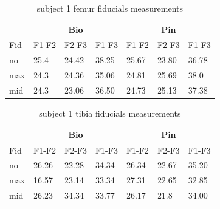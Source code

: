 \begin{table}[]
\centering
\begin{tabular}{ll|lll|lll|}
\cline{3-8}
    &  & \multicolumn{3}{c|}{Bio}  & \multicolumn{3}{c|}{Pin}    \\ \hline
\multicolumn{2}{|l|}{Fid} & \multicolumn{1}{l|}{F1-F2} & \multicolumn{1}{l|}{F2-F3} & F1-F3 & \multicolumn{1}{l|}{F1-F2} & \multicolumn{1}{l|}{F2-F3} & F1-F3 \\ \hline
\multicolumn{2}{|l|}{no}  & \multicolumn{1}{l|}{25.4}      & \multicolumn{1}{l|}{24.42}     & 38.25     & \multicolumn{1}{l|}{25.67}     & \multicolumn{1}{l|}{23.80}     & 36.78     \\ \hline
\multicolumn{2}{|l|}{max} & \multicolumn{1}{l|}{24.3}      & \multicolumn{1}{l|}{24.36}     & 35.06     & \multicolumn{1}{l|}{24.81}     & \multicolumn{1}{l|}{25.69}     & 38.0      \\ \hline
\multicolumn{2}{|l|}{mid} & \multicolumn{1}{l|}{24.3}      & \multicolumn{1}{l|}{23.06}     & 36.50     & \multicolumn{1}{l|}{24.73}     & \multicolumn{1}{l|}{25.13}     & 37.38     \\ \hline
\end{tabular}
\caption{subject 1 femur fiducials measurements }
\label{tab:sub1_femur}
\end{table}

\begin{table}[]
\centering
\begin{tabular}{ll|lll|lll|}
\cline{3-8}
       &        & \multicolumn{3}{c|}{Bio}   & \multicolumn{3}{c|}{Pin}    \\ \hline
\multicolumn{2}{|l|}{Fid} & \multicolumn{1}{l|}{F1-F2} & \multicolumn{1}{l|}{F2-F3} & F1-F3 & \multicolumn{1}{l|}{F1-F2} & \multicolumn{1}{l|}{F2-F3} & F1-F3 \\ \hline
\multicolumn{2}{|l|}{no}  & \multicolumn{1}{l|}{26.26}     & \multicolumn{1}{l|}{22.28}     & 34.34     & \multicolumn{1}{l|}{26.34}     & \multicolumn{1}{l|}{22.67}     & 35.20     \\ \hline
\multicolumn{2}{|l|}{max} & \multicolumn{1}{l|}{16.57}     & \multicolumn{1}{l|}{23.14}     & 33.34     & \multicolumn{1}{l|}{27.31}     & \multicolumn{1}{l|}{22.65}     & 32.85     \\ \hline
\multicolumn{2}{|l|}{mid} & \multicolumn{1}{l|}{26.23}     & \multicolumn{1}{l|}{34.34}     & 33.77     & \multicolumn{1}{l|}{26.17}     & \multicolumn{1}{l|}{21.8}      & 34.00     \\ \hline
\end{tabular}
\caption{subject 1 tibia fiducials measurements }
\label{tab:sub1_tibia}
\end{table}





